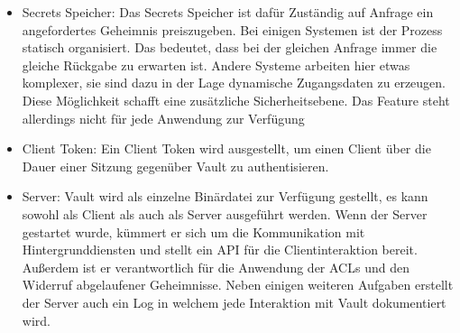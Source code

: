 \documentclass[
a4paper,   
titlepage,  
halfparskip,
12pt        
]{scrartcl}
\begin{document}
\begin{onehalfspacing}
\begin{itemize}
  \item Secrets Speicher: Das Secrets Speicher ist dafür Zuständig auf Anfrage ein angefordertes Geheimnis preiszugeben. Bei einigen Systemen ist der Prozess statisch organisiert. Das bedeutet, dass bei der gleichen Anfrage immer die gleiche Rückgabe zu erwarten ist. Andere Systeme arbeiten hier etwas komplexer, sie sind dazu in der Lage dynamische Zugangsdaten zu erzeugen. Diese Möglichkeit schafft eine zusätzliche Sicherheitsebene. Das Feature steht allerdings nicht für jede Anwendung zur Verfügung
  \item Client Token: Ein Client Token wird ausgestellt, um einen Client über die Dauer einer Sitzung gegenüber Vault zu authentisieren.
  \item Server: Vault wird als einzelne Binärdatei zur Verfügung gestellt, es kann sowohl als Client als auch als Server ausgeführt werden. Wenn der Server gestartet wurde, kümmert er sich um die Kommunikation mit Hintergrunddiensten und stellt ein \acs{API} für die Clientinteraktion bereit. Außerdem ist er verantwortlich für die Anwendung der \ac{ACL}s und den Widerruf abgelaufener Geheimnisse. Neben einigen weiteren Aufgaben erstellt der Server auch ein Log in welchem jede Interaktion mit Vault dokumentiert wird. 
\end{itemize}\cite{vault}


\end{onehalfspacing}
\end{document}
